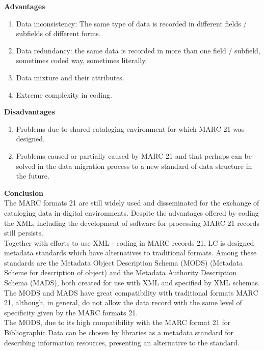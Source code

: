 \begin{enumerate}
	{\bf Advantages}
	\begin{enumerate}
		\item Data inconsistency: The same type of data is recorded in different fields / subfields of different forms.
		\item Data redundancy: the same data is recorded in more than one field / subfield, sometimes coded way, sometimes literally.	
		\item Data mixture and their attributes.
		\item Extreme complexity in coding.
	\end{enumerate}	
	{\bf Disadvantages}
	\begin{enumerate}
		\item Problems due to shared cataloging environment for which MARC 21 was designed.
		\item Problems caused or partially caused by MARC 21 and that perhaps can be solved in the data migration process to a new standard of data structure in the future.
	\end{enumerate}
	{\bf Conclusion}\\
	The MARC formats 21 are still widely used and disseminated for the exchange of cataloging data in digital environments. Despite the advantages offered by coding the XML, including the development of software for processing MARC 21 records still persists.\\
	Together with efforts to use XML - coding in MARC records 21, LC is designed metadata standards which have alternatives to traditional formats. Among these standards are the Metadata Object Description Schema (MODS) (Metadata Scheme for description of object) and the Metadata Authority Description Schema (MADS), both created for use with XML and specified by XML schemas.\\
	The MODS and MADS have great compatibility with traditional formats MARC 21, although, in general, do not allow the data record with the same level of specificity given by the MARC formats 21.\\
	The MODS, due to its high compatibility with the MARC format 21 for Bibliographic Data can be chosen by libraries as a metadata standard for describing information resources, presenting an alternative to the standard.


\end{enumerate}

